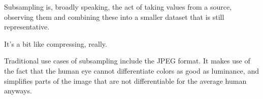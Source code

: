 Subsampling is, broadly speaking, the act of taking values from a source, observing them and combining these into a smaller dataset that is still representative.  

It's a bit like compressing, really.  

Traditional use cases of subsampling include the JPEG format. It makes use of the fact that the human eye cannot differentiate colors as good as luminance, and simplifies parts of the image that are not differentiable for the average human anyways. \cite{BrandenLambrecht2001}